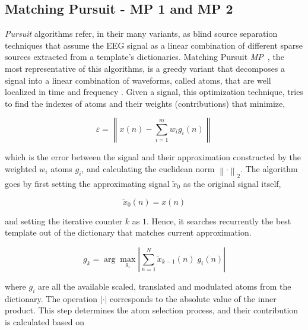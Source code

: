 \documentclass[brainsci,article,submit,moreauthors,pdftex,10pt,a4paper]{mdpi}
\begin{document}
\subsection{Matching Pursuit - MP 1 and MP 2}

\textit{Pursuit} algorithms refer, in their many variants, as blind source separation \citep{Vincent2010} techniques that assume the EEG signal as a linear combination of different sparse sources extracted from a template's dictionaries.  Matching Pursuit \textit{MP}~\citep{Mallat1993}, the most representative of this algorithms, is a greedy variant that decomposes a signal into a linear combination of waveforms, called atoms, that are well localized in time and frequency \citep{ChandranKS2016}.  Given a signal, this optimization technique, tries to find the indexes of atoms and their weights (contributions) that minimize,


\begin{equation}
\varepsilon =  \left\lVert   x(n) - \sum_{i=1}^{m} w_i g_{i}(n)   \right\rVert
\label{eq:mperror}
\end{equation}

which is the error between the signal and their approximation constructed by the weighted $w_i$ atoms $g_{i}$, and calculating the euclidean norm ${\left\lVert \cdot \right\rVert}_{2}$.  The algorithm goes by first setting the approximating signal $\tilde{x}_{0}$  as the original signal itself,  

\begin{equation}
\tilde{x}_{0}(n) = x(n)
\label{eq:mp2}
\end{equation}

\noindent and setting the iterative counter $k$ as $1$. Hence, it searches recurrently the best template out of the dictionary  that matches current approximation.  

\begin{equation}
g_{k} = \arg \max_{g_{i}} \left\lvert  \sum_{n=1}^{N} \tilde{x}_{k-1}(n) \; g_{i}(n) \right\rvert 
\label{eq:mp3}
\end{equation}

where $g_{i}$ are all the available scaled, translated and modulated atoms from the dictionary.  The operation $\left\lvert \cdot \right\rvert$ corresponds to the absolute value of the inner product.  This step determines the atom selection process, and their contribution is calculated based on 

\end{document}
